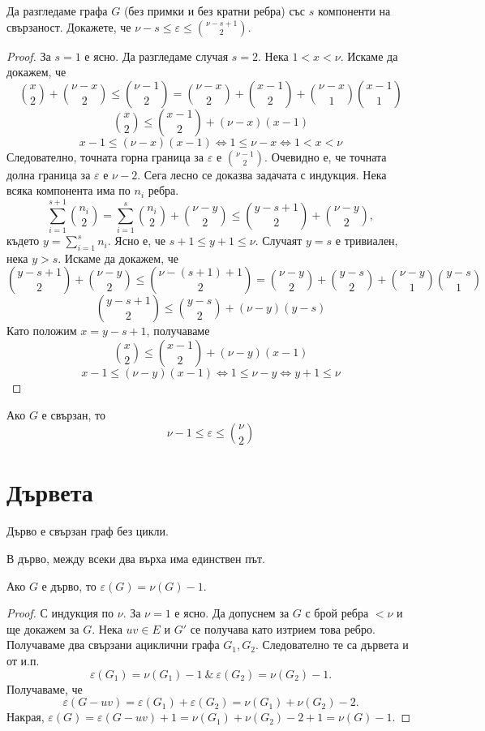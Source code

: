 \begin{problem} %
  Да разгледаме графа $G$ (без примки и без кратни ребра) със $s$ компоненти на свързаност.
  Докажете, че $\nu - s \leq \varepsilon \leq \binom{\nu-s+1}{2}$.
\end{problem}
\begin{proof}
  За $s = 1$ е ясно.
  Да разгледаме случая $s = 2$.
  Нека $1 < x <\nu$. Искаме да докажем, че 
  \[\binom{x}{2} + \binom{\nu-x}{2} \leq \binom{\nu-1}{2} = \binom{\nu-x}{2} + \binom{x-1}{2} + \binom{\nu-x}{1}\binom{x-1}{1}\]
  \[\binom{x}{2} \leq \binom{x-1}{2} + (\nu-x)(x-1)\]
  \[x-1 \leq (\nu-x)(x-1) \iff 1 \leq \nu - x \iff 1 < x < \nu\]
  Следователно, точната горна граница за $\varepsilon$ е $\binom{\nu - 1}{2}$. 
  Очевидно е, че точната долна граница за $\varepsilon$ е $\nu - 2$.
  Сега лесно се доказва задачата с индукция.
  Нека всяка компонента има по $n_i$ ребра. 
  \[\sum^{s+1}_{i=1}\binom{n_i}{2} = \sum^{s}_{i=1}\binom{n_i}{2} + \binom{\nu - y}{2} \leq \binom{y-s+1}{2} + \binom{\nu - y}{2},\]
  където $y = \sum^s_{i=1}n_i$. Ясно е, че $s+1\leq y + 1\leq\nu$.
  Случаят $y = s$ е тривиален, нека $y > s$.
  Искаме да докажем, че 
  \[\binom{y-s+1}{2} + \binom{\nu - y}{2} \leq \binom{\nu - (s+1) + 1}{2} = \binom{\nu-y}{2} + \binom{y-s}{2} + \binom{\nu-y}{1}\binom{y-s}{1} \]
  \[\binom{y-s+1}{2} \leq  \binom{y-s}{2} + (\nu-y)(y-s) \]
  Като положим $x = y-s+1$, получаваме
  \[\binom{x}{2} \leq  \binom{x-1}{2} + (\nu-y)(x-1) \]
  \[x-1 \leq (\nu-y)(x-1) \iff 1 \leq \nu - y \iff y+1 \leq \nu\]
\end{proof}

\begin{remark}
  Ако $G$ е свързан, то \[\nu-1\leq\varepsilon\leq\binom{\nu}{2}\]
\end{remark}


\section{Дървета}

\begin{dfn}
  Дърво е свързан граф без цикли.
\end{dfn}

\begin{thm}
  В дърво, между всеки два върха има единствен път.
\end{thm}

\begin{thm}
  Ако $G$ е дърво, то $\varepsilon(G) = \nu(G) - 1$.
\end{thm}
\begin{proof}
  С индукция по $\nu$. За $\nu = 1$ е ясно.
  Да допуснем за $G$ с брой ребра $<\nu$ и ще докажем за $G$.
  Нека $uv\in E$ и $G'$ се получава като изтрием това ребро.
  Получаваме два свързани ациклични графа $G_1, G_2$.
  Следователно те са дървета и от и.п. 
  \[\varepsilon(G_1) = \nu(G_1) - 1\ \&\ \varepsilon(G_2) = \nu(G_2) - 1.\]
  Получаваме, че 
  \[\varepsilon(G - uv) = \varepsilon(G_1) + \varepsilon(G_2) = \nu(G_1) + \nu(G_2) - 2.\]
  Накрая, $\varepsilon(G) = \varepsilon(G-uv) + 1 = \nu(G_1) + \nu(G_2) - 2 + 1= \nu(G) - 1$.
\end{proof}


